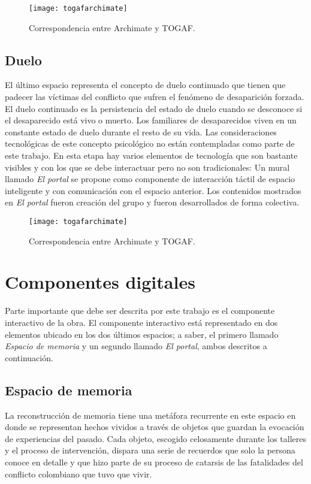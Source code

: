 \begin{figure}[h]\label{togafarchimate}
\centering
\texttt{[image: togafarchimate]}
\caption{Correspondencia entre Archimate y TOGAF.}
\end{figure}


\subsection{Duelo}

El último espacio representa el concepto de duelo continuado que tienen que padecer las víctimas del conflicto que sufren el fenómeno de desaparición forzada. El duelo continuado es la persistencia del estado de duelo cuando se desconoce si el desaparecido está vivo o muerto. Los familiares de desaparecidos viven en un constante estado de duelo durante el resto de su vida. Las consideraciones tecnológicas de este concepto psicológico no están contempladas como parte de este trabajo. En esta etapa hay varios elementos de tecnología que son bastante visibles y con los que se debe interactuar pero no son tradicionales: Un mural llamado \textit{El portal} se propone como componente de interacción táctil de espacio inteligente y con comunicación con el espacio anterior. Los contenidos mostrados en \textit{El portal} fueron creación del grupo y fueron desarrollados de forma colectiva.

\begin{figure}[h]\label{togafarchimate}
\centering
\texttt{[image: togafarchimate]}
\caption{Correspondencia entre Archimate y TOGAF.}
\end{figure}

\section{Componentes digitales}

Parte importante que debe ser descrita por este trabajo es el componente interactivo de la obra. El componente interactivo está representado en dos elementos ubicado en los dos últimos espacios; a saber, el primero llamado \textit{Espacio de memoria} y un segundo llamado \textit{El portal}, ambos descritos a continuación. 

\subsection{Espacio de memoria}

La reconstrucción de memoria tiene una metáfora recurrente en este espacio en donde se representan hechos vividos a través de objetos que guardan la evocación de experiencias del pasado. Cada objeto, escogido celosamente durante los talleres y el proceso de intervención, dispara una serie de recuerdos que solo la persona conoce en detalle y que hizo parte de su proceso de catarsis de las fatalidades del conflicto colombiano que tuvo que vivir.

